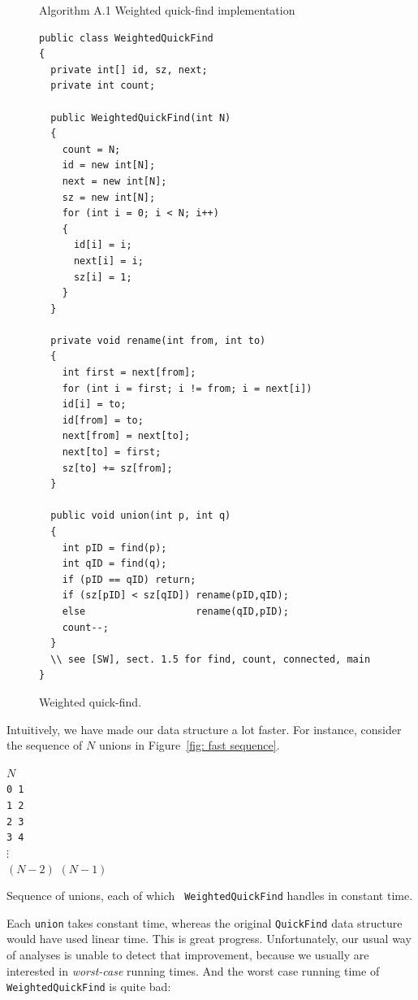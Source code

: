 \documentclass{tufte-handout}
\begin{document}
\begin{figure}

Algorithm A.1 Weighted quick-find implementation

\small
\begin{lstlisting}[basicstyle=\ttfamily,backgroundcolor=\color{white},
  frame=single,rulecolor=\color{gray!20},framesep=10pt, linewidth=12cm]
public class WeightedQuickFind
{
  private int[] id, sz, next;
  private int count;

  public WeightedQuickFind(int N)
  {
    count = N;
    id = new int[N];
    next = new int[N];
    sz = new int[N];
    for (int i = 0; i < N; i++) 
    { 
      id[i] = i;
      next[i] = i;
      sz[i] = 1;
    }
  }

  private void rename(int from, int to)
  {
    int first = next[from];
    for (int i = first; i != from; i = next[i])
	id[i] = to;
    id[from] = to;
    next[from] = next[to];
    next[to] = first;
    sz[to] += sz[from];
  }

  public void union(int p, int q) 
  {
    int pID = find(p); 
    int qID = find(q);
    if (pID == qID) return;
    if (sz[pID] < sz[qID]) rename(pID,qID);
    else                   rename(qID,pID);
    count--;
  }
  \\ see [SW], sect. 1.5 for find, count, connected, main
}
\end{lstlisting}
\caption{\label{fig: WUF impl}Weighted quick-find.}
\end{figure}


Intuitively, we have made our data structure a lot faster.
For instance, consider the sequence of $N$ unions in Figure~\ref{fig: fast sequence}.
\begin{marginfigure}
  \begin{tabbing}
    $N$\\
    {\tt 0 1}\\
    {\tt 1 2}\\
    {\tt 2 3}\\
    {\tt 3 4}\\
  $\vdots$\\
    $(N-2)$ $(N-1)$\\
  \end{tabbing}
\caption{\label{fig: fast sequence}Sequence of unions, each of which {\tt
    WeightedQuickFind} handles in constant time.}
\end{marginfigure}
Each {\tt union} takes constant time, whereas the original {\tt QuickFind} data structure would have used linear time.
This is great progress.
Unfortunately, our usual way of analyses is unable to detect that improvement, because we usually are interested in \emph{worst-case} running times.
And the worst case running time of {\tt WeightedQuickFind} is quite bad:
\end{document}

